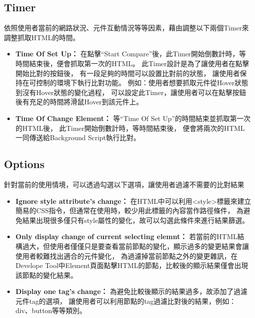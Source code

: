 \subsection{Timer}\label{s3.5.2}
依照使用者當前的網路狀況、元件互動情況等等因素，藉由調整以下兩個Timer來調整抓取HTML的時間。

\begin{itemize}
    \item\textbf{Time Of Set Up： }
    在點擊``Start Compare''後，此Timer開始倒數計時，等時間結束後，便會抓取第一次的HTML。
    此Timer設計是為了讓使用者在點擊開始比對的按鈕後，
    有一段足夠的時間可以設置比對前的狀態，
    讓使用者保持在可控制的環境下執行比對功能。
    例如：使用者想要抓取元件從Hover狀態到沒有Hover狀態的變化過程，
    可以設定此Timer，讓使用者可以在點擊按鈕後有充足的時間將滑鼠Hover到該元件上。

    \item\textbf{Time Of Change Element： }
    等``Time Of Set Up''的時間結束並抓取第一次的HTML後，
    此Timer開始倒數計時，等時間結束後，
    便會將兩次的HTML一同傳送給Background Script執行比對。

\end{itemize}

\subsection{Options}\label{s3.5.3}

針對當前的使用情境，可以透過勾選以下選項，讓使用者過濾不需要的比對結果

    \begin{itemize}
        \item\textbf{Ignore style attribute's change： }
        在HTML中可以利用<style>標籤來建立簡易的CSS指令，但通常在使用時，較少用此標籤的內容當作路徑條件，
        為避免結果出現很多僅只有style屬性的變化，故可以勾選此條件來進行結果篩選。

        \item\textbf{Only display change of current selecting elemnt： }
        若當前的HTML結構過大，但使用者僅僅只是要查看當前節點的變化，顯示過多的變更結果會讓使用者較難找出適合的元件變化，
        為過濾掉當前節點之外的變更雜訊，在Develope Tool中Element頁面點擊HTML的節點，比較後的顯示結果僅會出現該節點的變化結果。
        
        \item\textbf{Display one tag's change： }
        為避免比較後顯示的結果過多，故添加了過濾元件tag的選項，
        讓使用者可以利用節點的tag過濾比對後的結果，例如：div、button等等類別。

    \end{itemize}

